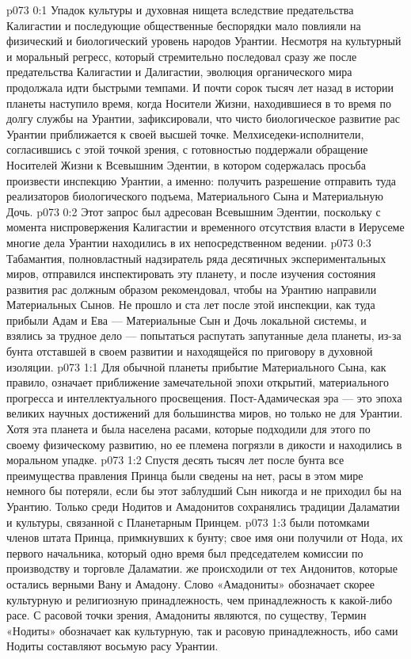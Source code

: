 \vs p073 0:1 Упадок культуры и духовная нищета вследствие предательства Калигастии и последующие общественные беспорядки мало повлияли на физический и биологический уровень народов Урантии. Несмотря на культурный и моральный регресс, который стремительно последовал сразу же после предательства Калигастии и Далигастии, эволюция органического мира продолжала идти быстрыми темпами. И почти сорок тысяч лет назад в истории планеты наступило время, когда Носители Жизни, находившиеся в то время по долгу службы на Урантии, зафиксировали, что чисто биологическое развитие рас Урантии приближается к своей высшей точке. Мелхиседеки\hyp{}исполнители, согласившись с этой точкой зрения, с готовностью поддержали обращение Носителей Жизни к Всевышним Эдентии, в котором содержалась просьба произвести инспекцию Урантии, а именно: получить разрешение отправить туда реализаторов биологического подъема, Материального Сына и Материальную Дочь.
\vs p073 0:2 Этот запрос был адресован Всевышним Эдентии, поскольку с момента ниспровержения Калигастии и временного отсутствия власти в Иерусеме многие дела Урантии находились в их непосредственном ведении.
\vs p073 0:3 Табамантия, полновластный надзиратель ряда десятичных экспериментальных миров, отправился инспектировать эту планету, и после изучения состояния развития рас должным образом рекомендовал, чтобы на Урантию направили Материальных Сынов. Не прошло и ста лет после этой инспекции, как туда прибыли Адам и Ева --- Материальные Сын и Дочь локальной системы, и взялись за трудное дело --- попытаться распутать запутанные дела планеты, из\hyp{}за бунта отставшей в своем развитии и находящейся по приговору в духовной изоляции.
\vs p073 1:1 Для обычной планеты прибытие Материального Сына, как правило, означает приближение замечательной эпохи открытий, материального прогресса и интеллектуального просвещения. Пост\hyp{}Адамическая эра --- это эпоха великих научных достижений для большинства миров, но только не для Урантии. Хотя эта планета и была населена расами, которые подходили для этого по своему физическому развитию, но ее племена погрязли в дикости и находились в моральном упадке.
\vs p073 1:2 Спустя десять тысяч лет после бунта все преимущества правления Принца были сведены на нет, расы в этом мире немного бы потеряли, если бы этот заблудший Сын никогда и не приходил бы на Урантию. Только среди Нодитов и Амадонитов сохранялись традиции Даламатии и культуры, связанной с Планетарным Принцем.
\vs p073 1:3  были потомками членов штата Принца, примкнувших к бунту; свое имя они получили от Нода, их первого начальника, который одно время был председателем комиссии по производству и торговле Даламатии.  же происходили от тех Андонитов, которые остались верными Вану и Амадону. Слово «Амадониты» обозначает скорее культурную и религиозную принадлежность, чем принадлежность к какой\hyp{}либо расе. С расовой точки зрения, Амадониты являются, по существу,  Термин «Нодиты» обозначает как культурную, так и расовую принадлежность, ибо сами Нодиты составляют восьмую расу Урантии.
